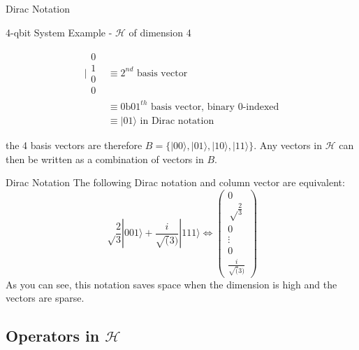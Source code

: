 \documentclass[svgnames,smaller,aspectratio=169]{beamer}
\begin{document}
\begin{frame}[fragile]{Dirac Notation}
  
  \begin{block}{4-qbit System Example - $\mathcal{H}$ of dimension 4}
    \begin{center}
      \begin{align*}
        \biggl|\begin{smallmatrix} 0 \\ 1 \\ 0 \\ 0 \end{smallmatrix} & \equiv 2^{nd} \text{ basis vector} \\%
        & \equiv 0\text{b}01^{th} \text{ basis vector, binary 0-indexed} \\[0.8em]
        & \equiv |01\rangle \text{ in Dirac notation}
      \end{align*}
    \end{center}
    the 4 basis vectors are therefore $\textit{B} = \{|00\rangle, |01\rangle, |10\rangle, |11\rangle\}$. Any vectors in
    $\mathcal{H}$ can then be written as a combination of vectors in $\textit{B}$.
  \end{block}
\end{frame}

\begin{frame}[fragile]{Dirac Notation}
  The following Dirac notation and column vector are equivalent:
  $$\sqrt\frac{2}{3}|001\rangle + \frac{i}{\sqrt(3)}|111\rangle \Longleftrightarrow \begin{pmatrix}0 \\ \sqrt\frac{2}{3}
    \\ 0 \\ \vdots \\ 0 \\ \frac{i}{\sqrt(3)} \end{pmatrix}$$
  As you can see, this notation saves space when the dimension is high and the vectors are sparse.
\end{frame}

\subsection{Operators in $\mathcal{H}$}
\end{document}
